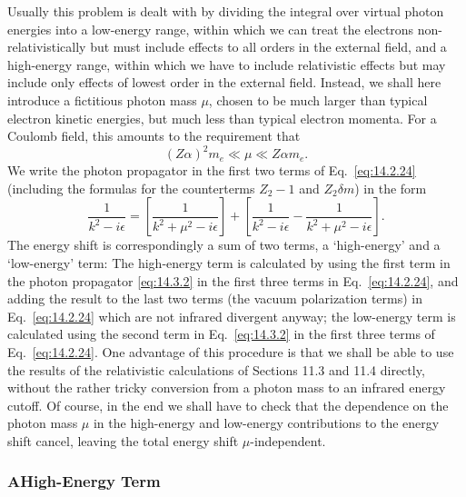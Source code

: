 Usually this problem is dealt with by dividing the integral over virtual
photon energies into a low-energy range, within which we can treat the
electrons non-relativistically but must include effects to all orders in the
external field, and a high-energy range, within which we have to include
relativistic effects but may include only effects of lowest order in the
external field. Instead, we shall here introduce a fictitious photon mass
$\mu$, chosen to be much larger than typical electron kinetic energies, but
much less than typical electron momenta. For a Coulomb field, this amounts to
the requirement that
\begin{equation}
(Z\alpha)^2m_e\ll\mu\ll Z\alpha m_e.
\tag{14.3.1}\label{eq:14.3.1}
\end{equation}
We write the photon propagator in the first two terms of Eq.~\eqref{eq:14.2.24}
(including the formulas for the counterterms $Z_2-1$ and $Z_2\delta m$) in the
form
\begin{equation}
\frac{1}{k^2-i\epsilon}
=\left[\frac{1}{k^2+\mu^2-i\epsilon}\right]
+\left[\frac{1}{k^2-i\epsilon}
-\frac{1}{k^2+\mu^2-i\epsilon}\right].
\tag{14.3.2}\label{eq:14.3.2}
\end{equation}
The energy shift is correspondingly a sum of two terms, a `high-energy' and a
`low-energy' term: The high-energy term is calculated by using the first term
in the photon propagator \eqref{eq:14.3.2} in the first three terms in
Eq.~\eqref{eq:14.2.24}, and adding the result to the last two terms (the vacuum
polarization terms) in Eq.~\eqref{eq:14.2.24} which are not infrared divergent
anyway; the low-energy term is calculated using the second term in
Eq.~\eqref{eq:14.3.2} in the first three terms of Eq.~\eqref{eq:14.2.24}. One
advantage of this procedure is that we shall be able to use the results of the
relativistic calculations of Sections 11.3 and 11.4 directly, without the
rather tricky conversion from a photon mass to an infrared energy cutoff. Of
course, in the end we shall have to check that the dependence on the photon
mass $\mu$ in the high-energy and low-energy contributions to the energy shift
cancel, leaving the total energy shift $\mu$-independent.

\subsubsection*{A\quad High-Energy Term}

